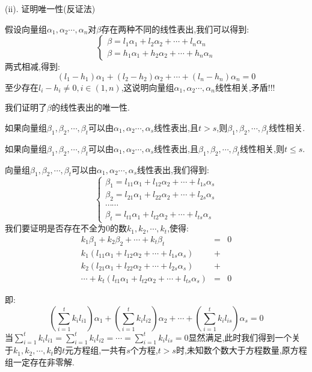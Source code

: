 \begin{theorem}[判别线性相关性的七大定理]
\begin{anymark}[证明]
		(ii). 证明唯一性(反证法)
		
		假设向量组$\alpha_{1},\alpha_{2}\cdots,\alpha_{n}$对$\beta$存在两种不同的线性表出,我们可以得到:  
		$$\left\lbrace 
		\begin{array}{l}
			\beta=l_{1}\alpha_{1}+l_{2}\alpha_{2}+\cdots+l_{n}\alpha_{n}\\
			\beta=h_{1}\alpha_{1}+h_{2}\alpha_{2}+\cdots+h_{n}\alpha_{n}
		\end{array}
		\right. $$
		两式相减,得到:  
		$$(l_{1}-h_{1})\alpha_{1}+(l_{2}-h_{2})\alpha_{2}+\cdots+(l_{n}-h_{n})\alpha_{n}=0$$
		至少存在$l_{i}-h_{i}\neq 0,i\in(1,n)$,这说明向量组$\alpha_{1},\alpha_{2}\cdots,\alpha_{n}$线性相关,矛盾!!!
		
		我们证明了$\beta$的线性表出的唯一性.
	\end{anymark}
	
	如果向量组$\beta_{1},\beta_{2},\cdots,\beta_{t}$可以由$\alpha_{1},\alpha_{2}\cdots,\alpha_{s}$线性表出,且$t>s$,则$\beta_{1},\beta_{2},\cdots,\beta_{t}$线性相关.
	
	如果向量组$\beta_{1},\beta_{2},\cdots,\beta_{t}$可以由$\alpha_{1},\alpha_{2}\cdots,\alpha_{s}$线性表出,且$\beta_{1},\beta_{2},\cdots,\beta_{t}$线性相关,则$t\leq s$.
	\begin{anymark}[证明]
		向量组$\beta_{1},\beta_{2},\cdots,\beta_{t}$可以由$\alpha_{1},\alpha_{2}\cdots,\alpha_{s}$线性表出,我们得到:  
		$$\left\lbrace 
		\begin{array}{l}
			\beta_{1}=l_{11}\alpha_{1}+l_{12}\alpha_{2}+\cdots+l_{1s}\alpha_{s}\\
			\beta_{2}=l_{21}\alpha_{1}+l_{22}\alpha_{2}+\cdots+l_{2s}\alpha_{s}\\
			\cdots\cdots\\
			\beta_{t}=l_{t1}\alpha_{1}+l_{t2}\alpha_{2}+\cdots+l_{ts}\alpha_{s}
		\end{array}
		\right. $$
		我们要证明是否存在不全为$0$的数$k_{1},k_{2},\cdots,k_{t}$,使得:  
		\begin{eqnarray*}
			k_{1}\beta_{1}+k_{2}\beta_{2}+\cdots+k_{t}\beta_{t}&=&0\\
			k_{1}(l_{11}\alpha_{1}+l_{12}\alpha_{2}+\cdots+l_{1s}\alpha_{s})&+&\\
			k_{2}(l_{21}\alpha_{1}+l_{22}\alpha_{2}+\cdots+l_{2s}\alpha_{s})&+&\\
			\cdots+k_{t}(l_{t1}\alpha_{1}+l_{t2}\alpha_{2}+\cdots+l_{ts}\alpha_{s})&=&0
		\end{eqnarray*}

		即:  
		$$(\sum\limits_{i=1}^{t}k_{i}l_{i1})\alpha_{1}+(\sum\limits_{i=1}^{t}k_{i}l_{i2})\alpha_{2}+\cdots+(\sum\limits_{i=1}^{t}k_{i}l_{is})\alpha_{s}=0$$
		当$\sum\limits_{i=1}^{t}k_{i}l_{i1}=\sum\limits_{i=1}^{t}k_{i}l_{i2}=\cdots=\sum\limits_{i=1}^{t}k_{i}l_{is}=0$显然满足,此时我们得到一个关于$k_{1},k_{2},\cdots,k_{t}$的$t$元方程组,一共有$s$个方程,$t>s$时,未知数个数大于方程数量,原方程组一定存在非零解.
		

\end{anymark}
\end{theorem}
